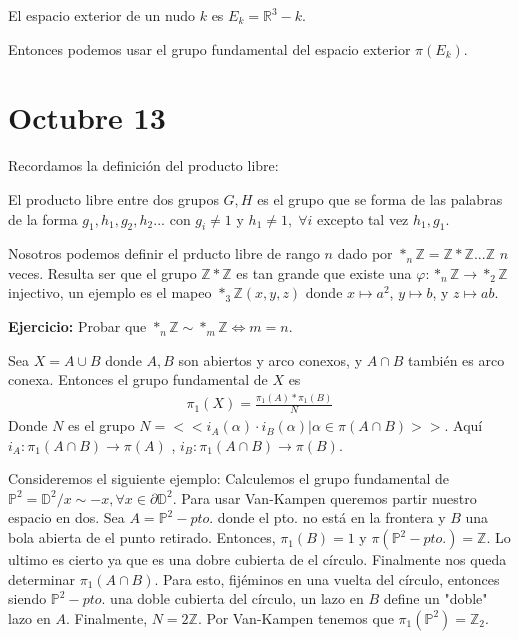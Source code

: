 \documentclass{article}
\theoremstyle{mytheoremstyle}
\theoremstyle{mytheoremstyle}
\theoremstyle{myproblemstyle}
\begin{document}
    \begin{definition}
      El espacio exterior de un nudo $k$ es $E_k=\mathbb{R}^3- k$.
    \end{definition}

    Entonces podemos usar el grupo fundamental del espacio exterior $\pi(E_k)$.

    \section{Octubre 13}

    Recordamos la definición del producto libre:
    \begin{definition}
      El producto libre entre dos grupos $G,H$ es el grupo que se forma de las palabras de la forma $g_1,h_1,g_2,h_2 ... $ con $g_i \neq 1$ y $h_1\neq 1, \; \forall i$  excepto tal vez $h_1 , g_1$.  
    \end{definition}

    Nosotros podemos definir el prducto libre de rango $n$ dado por $*_{n} \mathbb{Z}=\mathbb{Z}*\mathbb{Z}...\mathbb{Z}$ $n$ veces. Resulta ser que el grupo $\mathbb{Z}*\mathbb{Z}$ es tan grande que existe una $\varphi: *_n\mathbb{Z}\to *_2\mathbb{Z}$ injectivo, un ejemplo es el mapeo $*_3\mathbb{Z}(x,y,z)$ donde $x\mapsto a^2$, $y\mapsto b$,  y $z\mapsto ab$.

    \textbf{Ejercicio:} Probar que $*_n \mathbb{Z} \sim *_m \mathbb{Z} \iff m=n$. 
    \newpage

    \begin{theorem}
      Sea $X=A\cup B $ donde $A, B$ son abiertos y arco conexos, y $A \cap B$ también es arco conexa. Entonces el grupo fundamental de $X$ es 
      \begin{align}
        \pi_1(X)=\frac{\pi_1(A)*\pi_1(B)}{N}
      \end{align}
      Donde $N$ es el grupo $N=<<i_A(\alpha)\cdot i_B(\alpha)| \alpha \in \pi(A\cap B)>>$. Aquí $i_A: \pi_1(A\cap B) \to \pi(A)$ , $i_B: \pi_1(A\cap B) \to \pi(B)$.
    \end{theorem}

    Consideremos el siguiente ejemplo: Calculemos el grupo fundamental de $\mathbb{P}^2= \mathbb{D}^2/ x \sim -x , \forall x \in \partial \mathbb{D}^2$. Para usar Van-Kampen queremos partir nuestro espacio en dos. Sea $A = \mathbb{P}^2 - pto.$ donde el pto. no está en la frontera y $B$ una bola abierta de el punto retirado. Entonces, $\pi_1(B)= 1$ y $\pi(\mathbb{P}^2-pto.)=\mathbb{Z}$. Lo ultimo es cierto ya que es una dobre cubierta de el círculo. Finalmente nos queda determinar $\pi_1(A\cap B)$. Para esto, fijéminos en una vuelta del círculo, entonces siendo $\mathbb{P}^2-pto.$ una doble cubierta del círculo, un lazo en $B$ define un "doble" lazo en $A$. Finalmente, $N=2\mathbb{Z}$. Por Van-Kampen tenemos que $\pi_1(\mathbb{P}^2)=\mathbb{Z}_2$. 
\end{document}
